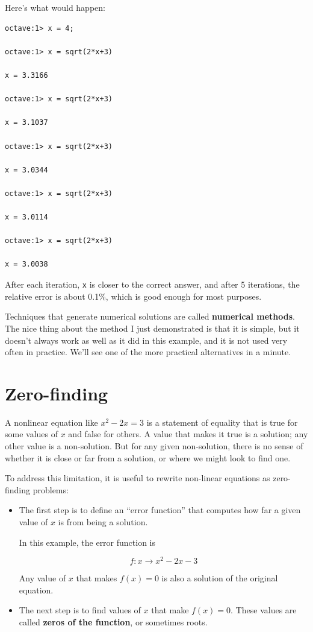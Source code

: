 \documentclass{book}
\begin{document}
Here's what would happen:

\begin{verbatim}
octave:1> x = 4;

octave:1> x = sqrt(2*x+3)

x = 3.3166

octave:1> x = sqrt(2*x+3)

x = 3.1037

octave:1> x = sqrt(2*x+3)

x = 3.0344

octave:1> x = sqrt(2*x+3)

x = 3.0114

octave:1> x = sqrt(2*x+3)

x = 3.0038
\end{verbatim}

After each iteration, {\tt x} is closer to the correct answer,
and after 5 iterations, the relative error is about 0.1\%, which
is good enough for most purposes.

Techniques that generate numerical solutions are called
{\bf numerical methods}. The nice thing about the method I
just demonstrated is that it is simple, but it doesn't always
work as well as it did in this example, and it is not used
very often in practice. We'll see one of
the more practical alternatives in a minute.




\section{Zero-finding}
\label{zero}

A nonlinear equation like $x^2 - 2x = 3$ is a statement of
equality that is true for some values of $x$ and false for
others. A value that makes it true is a solution;
any other value is a non-solution. But for any given non-solution,
there is no sense of whether it is close or far from a solution,
or where we might look to find one.

To address this limitation, it is useful to
rewrite non-linear equations as zero-finding problems:

\begin{itemize}

\item The first step is to define
an ``error function'' that computes how far
a given value of $x$ is from being a solution.

In this example, the error function is

\[ f : x \to x^2 - 2x -3 \]

Any value of $x$ that makes $f(x) = 0$ is also a solution
of the original equation.

\item The next step is to find values of $x$ that make
$f(x) = 0$. These values are called {\bf zeros of the
function}, or sometimes roots.

\end{itemize}
\end{document}
